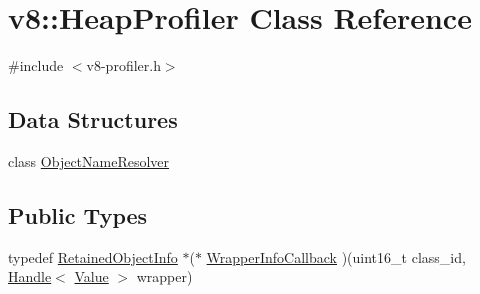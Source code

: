 \hypertarget{classv8_1_1HeapProfiler}{\section{v8\-:\-:Heap\-Profiler Class Reference}
\label{classv8_1_1HeapProfiler}
}


{\ttfamily \#include $<$v8-\/profiler.\-h$>$}

\subsection*{Data Structures}
\begin{DoxyCompactItemize}
\item 
class \hyperlink{classv8_1_1HeapProfiler_1_1ObjectNameResolver}{Object\-Name\-Resolver}
\end{DoxyCompactItemize}
\subsection*{Public Types}
\begin{DoxyCompactItemize}
\item 
typedef \hyperlink{classv8_1_1RetainedObjectInfo}{Retained\-Object\-Info} $\ast$($\ast$ \hyperlink{classv8_1_1HeapProfiler_a588ccdcc02823c20cbb6f3ca58944684}{Wrapper\-Info\-Callback} )(uint16\-\_\-t class\-\_\-id, \hyperlink{classv8_1_1Handle}{Handle}$<$ \hyperlink{classv8_1_1Value}{Value} $>$ wrapper)
\end{DoxyCompactItemize}
